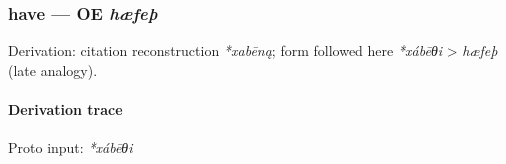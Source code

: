 \documentclass[
  british,
  a4paper,
]{article}
\begin{document}
\subsubsection{\texorpdfstring{have --- OE
\emph{hæfeþ}}{have --- OE hæfeþ}}\label{have-oe-huxe6feuxfe}

Derivation: citation reconstruction \emph{*xabēną}; form followed here
\emph{*xábēθi} \textgreater{} \emph{hæfeþ} (late analogy).

\paragraph{Derivation trace}\label{derivation-trace-129}

Proto input: \emph{*xábēθi}

\begingroup
\setlength{\fboxsep}{6pt}
\end{document}
